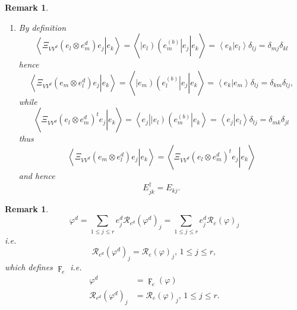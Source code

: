 \documentclass[aps,preprint]{revtex4}%
\newtheorem{remark}[theorem]{Remark}
\begin{document}
\begin{remark}
\begin{enumerate}
\begin{enumerate}
\item By definition
\begin{equation}
\left\langle \left.  \overset{}{\Xi_{VV^{d}}\left(  e_{l}\otimes e_{m}%
^{d}\right)  }e_{j}\right\vert e_{k}\right\rangle =\left\langle \left.
\overset{}{\left\vert e_{l}\right)  \left(  e_{m}^{\left(  b\right)
}\right\vert }e_{j}\right\vert e_{k}\right\rangle =\left\langle \left.
\overset{}{e_{k}}\right\vert e_{l}\right\rangle \delta_{lj}=\delta_{mj}%
\delta_{kl}%
\end{equation}
hence
\begin{equation}
\left\langle \left.  \overset{}{\Xi_{VV^{d}}\left(  e_{m}\otimes e_{l}%
^{d}\right)  }e_{j}\right\vert e_{k}\right\rangle =\left\langle \left.
\overset{}{\left\vert e_{m}\right)  \left(  e_{l}^{\left(  b\right)
}\right\vert }e_{j}\right\vert e_{k}\right\rangle =\left\langle \left.
\overset{}{e_{k}}\right\vert e_{m}\right\rangle \delta_{lj}=\delta_{km}%
\delta_{lj},
\end{equation}
while
\begin{equation}
\left\langle \left.  \overset{}{\Xi_{VV^{d}}\left(  e_{l}\otimes e_{m}%
^{d}\right)  ^{t}}e_{j}\right\vert e_{k}\right\rangle =\left\langle \left.
\overset{\overset{}{}}{e_{j}}\right\vert \left\vert e_{l}\right)  \left(
e_{m}^{\left(  b\right)  }\right\vert e_{k}\right\rangle =\left\langle \left.
\overset{}{e_{j}}\right\vert e_{l}\right\rangle \delta_{lj}=\delta_{mk}%
\delta_{jl}%
\end{equation}
thus
\begin{equation}
\left\langle \left.  \overset{}{\Xi_{VV^{d}}\left(  e_{m}\otimes e_{l}%
^{d}\right)  }e_{j}\right\vert e_{k}\right\rangle =\left\langle \left.
\overset{}{\Xi_{VV^{d}}\left(  e_{l}\otimes e_{m}^{d}\right)  ^{t}}%
e_{j}\right\vert e_{k}\right\rangle
\end{equation}
and hence
\begin{equation}
E_{jk}^{\dagger}=E_{kj}.
\end{equation}

\end{enumerate}
\end{enumerate}
\end{remark}

\begin{remark}%
\begin{equation}
\varphi^{d}=\sum_{1\leq j\leq r}e_{j}^{d}\mathcal{R}_{e^{d}}\left(
\varphi^{d}\right)  _{j}=\sum_{1\leq j\leq r}e_{j}^{d}\mathcal{R}_{e}\left(
\varphi\right)  _{j}%
\end{equation}
i.e.
\begin{equation}
\mathcal{R}_{e^{d}}\left(  \varphi^{d}\right)  _{j}=\mathcal{R}_{e}\left(
\varphi\right)  _{j},\,1\leq j\leq r,
\end{equation}
which defines $\digamma_{e}$ i.e.%
\begin{align}
\varphi^{d}  &  =\digamma_{e}\left(  \varphi\right) \\
\mathcal{R}_{e^{d}}\left(  \varphi^{d}\right)  _{j}  &  =\mathcal{R}%
_{e}\left(  \varphi\right)  _{j},\,1\leq j\leq r.
\end{align}

\end{remark}
\end{document}
